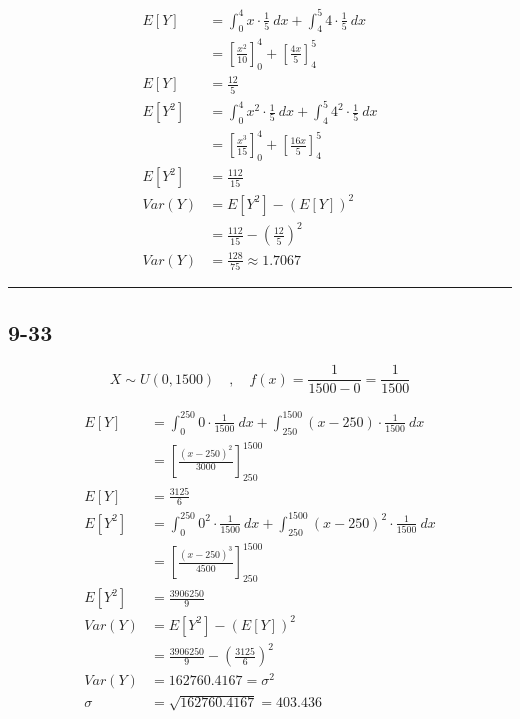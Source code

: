 \documentclass{article}
\newcommand{\qline}{\par\noindent\rule{4.5in}{1pt}}
\begin{document}
			\begin{equation*}
				\begin{split}
					E[Y] &= \int_{0}^{4} x \cdot \frac{1}{5} \ dx + \int_{4}^{5} 4 \cdot \frac{1}{5} \ dx \\
					&= \left[ \frac{x^2}{10} \right]^4_0 + \left[ \frac{4x}{5} \right]^5_4 \\
					E[Y] &= \frac{12}{5} \\
					E[Y^2] &= \int_{0}^{4} x^2 \cdot \frac{1}{5} \ dx + \int_{4}^{5} 4^2 \cdot \frac{1}{5} \ dx \\
					&= \left[ \frac{x^3}{15} \right]^4_0 + \left[ \frac{16x}{5} \right]^5_4 \\
					E[Y^2] &= \frac{112}{15} \\
					Var(Y) &= E[Y^2] - \left( E[Y] \right)^2 \\
					&= \frac{112}{15} - \left( \frac{12}{5} \right)^2 \\
					Var(Y) &= \frac{128}{75} \approx \boxed{\num{1.7067}}
				\end{split}
			\end{equation*}

	\qline

		\subsection*{9-33}

			\[
				X \sim U(0, 1500) \quad,\quad f(x) = \frac{1}{1500 - 0} = \frac{1}{1500}
			\]

			\begin{equation*}
				\begin{split}
					E[Y] &= \int_{0}^{250} 0 \cdot \frac{1}{1500} \ dx + \int_{250}^{1500} (x-250) \cdot \frac{1}{1500} \ dx \\
					&= \left[ \frac{(x-250)^2}{3000} \right]^{1500}_{250} \\
					E[Y] &= \frac{3125}{6} \\
					E[Y^2] &= \int_{0}^{250} 0^2 \cdot \frac{1}{1500} \ dx + \int_{250}^{1500} (x-250)^2 \cdot \frac{1}{1500} \ dx \\
					&= \left[ \frac{(x-250)^3}{4500} \right]^{1500}_{250} \\
					E[Y^2] &= \frac{3906250}{9} \\
					Var(Y) &= E[Y^2] - \left( E[Y] \right)^2 \\
					&= \frac{3906250}{9} - \left( \frac{3125}{6} \right)^2 \\
					Var(Y) &= \num{162760.4167} = \sigma^2 \\
					\sigma &= \sqrt{\num{162760.4167}} = \boxed{\num{403.436}}
				\end{split}
			\end{equation*}
\end{document}
